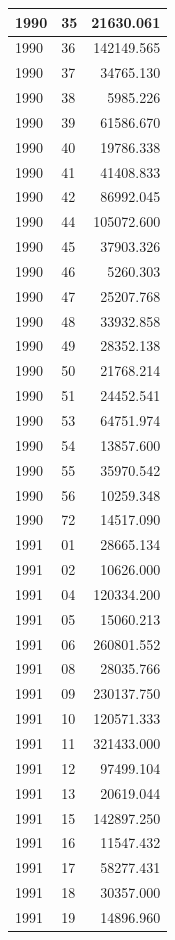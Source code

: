 \documentclass[
]{book}
\begin{document}
\begin{tabular}{l|l|r}
1990 & 35 & 21630.061\\
\hline
1990 & 36 & 142149.565\\
\hline
1990 & 37 & 34765.130\\
\hline
1990 & 38 & 5985.226\\
\hline
1990 & 39 & 61586.670\\
\hline
1990 & 40 & 19786.338\\
\hline
1990 & 41 & 41408.833\\
\hline
1990 & 42 & 86992.045\\
\hline
1990 & 44 & 105072.600\\
\hline
1990 & 45 & 37903.326\\
\hline
1990 & 46 & 5260.303\\
\hline
1990 & 47 & 25207.768\\
\hline
1990 & 48 & 33932.858\\
\hline
1990 & 49 & 28352.138\\
\hline
1990 & 50 & 21768.214\\
\hline
1990 & 51 & 24452.541\\
\hline
1990 & 53 & 64751.974\\
\hline
1990 & 54 & 13857.600\\
\hline
1990 & 55 & 35970.542\\
\hline
1990 & 56 & 10259.348\\
\hline
1990 & 72 & 14517.090\\
\hline
1991 & 01 & 28665.134\\
\hline
1991 & 02 & 10626.000\\
\hline
1991 & 04 & 120334.200\\
\hline
1991 & 05 & 15060.213\\
\hline
1991 & 06 & 260801.552\\
\hline
1991 & 08 & 28035.766\\
\hline
1991 & 09 & 230137.750\\
\hline
1991 & 10 & 120571.333\\
\hline
1991 & 11 & 321433.000\\
\hline
1991 & 12 & 97499.104\\
\hline
1991 & 13 & 20619.044\\
\hline
1991 & 15 & 142897.250\\
\hline
1991 & 16 & 11547.432\\
\hline
1991 & 17 & 58277.431\\
\hline
1991 & 18 & 30357.000\\
\hline
1991 & 19 & 14896.960\\

\end{tabular}
\end{document}
